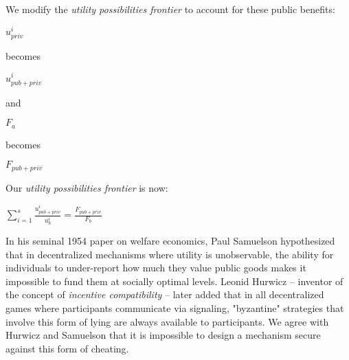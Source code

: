 \documentclass[oneside]{article}   	%
\begin{document}
We modify the \textit{utility possibilities frontier} to account for these public benefits:

\large
\begin{adjustwidth}{1.5em}{1.5em} 
\begin{math}
{u_{priv}^i}
\end{math}
\end{adjustwidth}
\normalsize

becomes

\large
\begin{adjustwidth}{1.5em}{1.5em} 
\begin{math}
{u_{{pub}+{priv}}^i}
\end{math}
\end{adjustwidth}
\normalsize

and

\large
\begin{adjustwidth}{1.5em}{1.5em} 
\begin{math}
{F_a}
\end{math}
\end{adjustwidth}
\normalsize

becomes

\large
\begin{adjustwidth}{1.5em}{1.5em} 
\begin{math}
{F_{{pub}+{priv}}}
\end{math}
\end{adjustwidth}
\normalsize

Our \textit{utility possibilities frontier} is now:

\LARGE
\begin{adjustwidth}{1.5em}{1.5em} 
\begin{math}
\sum_{i=1}^{s} \frac{u_{{pub}+{priv}}^i}{u_b^i} = \frac{F_{{pub}+{priv}}}{F_b}
\end{math}
\end{adjustwidth}
\normalsize

In his seminal 1954 paper on welfare economics, Paul Samuelson hypothesized that in decentralized mechanisms where utility is unobservable, the ability for individuals to under-report how much they value public goods makes it impossible to fund them at socially optimal levels. Leonid Hurwicz -- inventor of the concept of \textit{incentive compatibility} -- later added that in all decentralized games where participants communicate via signaling, "byzantine" strategies that involve this form of lying are always available to participants. We agree with Hurwicz and Samuelson that it is impossible to design a mechanism secure against this form of cheating.
\end{document}
